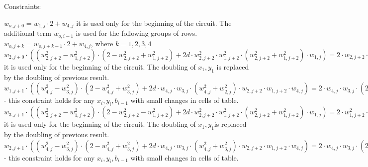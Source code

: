  Constraints:
\begin{center}
$w_{o, j + 0} = w_{1, j} \cdot 2 + w_{4, j}$ it is used only for the beginning of the circuit. The additional term $w_{o, i - 1}$ is used for the following groups of rows. \\
$w_{o, j + k} = w_{o, j + k - 1} \cdot 2 + w_{4, j}$, where $k = 1, 2, 3, 4$\\

$w_{2, j + 0} \cdot ((w_{2, j + 2}^2 - w_{1, j + 2}^2) \cdot (2 - w_{2, j + 2}^2 + w_{1, j + 2}^2) + 2d \cdot w_{2, j + 2}^2 \cdot w_{1, j + 2}^2 \cdot (w_{2, j + 2}^2 + w_{1, j + 2}^2) \cdot w_{1, j}) = 
2 \cdot w_{2, j + 2} \cdot (w_{2, j + 2} \cdot w_{1,j} + 1 - w_{1,j}) \cdot w_{1, j + 2} \cdot (2 - w_{2, j + 2}^2 + w_{1, j + 2}^2) 
+ w_{1, j + 2} \cdot (w_{2, j + 2}^2 + w_{1, j + 2}^2) \cdot (w_{2, j + 2}^2 - w_{1, j + 2}^2)\cdot w_{1, j}$ it is used only for the beginning of the circuit. The doubling of $x_1, y_1$ is replaced by the doubling of previous result.\\

$w_{1, j + 1} \cdot ((w_{4, j }^2 - w_{3, j }^2) \cdot (2 - w_{4, j}^2 + w_{3, j}^2) + 2d \cdot w_{4, j } \cdot w_{3, j } \cdot (w_{4, j}^2 + w_{2, j}^2) \cdot w_{2, j + 2} \cdot w_{1, j + 2} \cdot w_{4, j}) = 
2 \cdot w_{4, j } \cdot w_{3, j } \cdot (2 - w_{4, j }^2 + w_{3, j }^2) \cdot (w_{2, j + 2} \cdot w_{4,j} + 1 - w_{4,j})  
+ w_{3, j } \cdot (w_{4, j }^2 + w_{3, j }^2) \cdot (w_{4, j }^2 - w_{3, j }^2) \cdot w_{1, j + 2} \cdot w_{4, j}$ - this constraint holds for any $x_i, y_i, b_{i -1}$ with small changes in cells of table. \\

$w_{3, j+1} \cdot ((w_{2, j + 2}^2 - w_{1, j + 2}^2) \cdot (2 - w_{2, j + 2}^2 - w_{1, j + 2}^2) + 2d \cdot w_{2, j + 2}^2 \cdot w_{1, j + 2}^2 \cdot (w_{2, j + 2}^2 + w_{1, j + 2}^2) \cdot w_{1, j}) = 
2 \cdot w_{1, j + 2}^2 \cdot (w_{2, j + 2} \cdot (2 - w_{2, j + 2}^2 + w_{1, j + 2}^2)\cdot w_{1, j}  
+ (w_{2, j + 2}^2 - w_{1, j + 2}^2)\cdot (w_{2, j + 2}^2 + w_{1, j + 2}^2) \cdot (w_{2, j + 2} \cdot w_{1,j} + 1 - w_{1,j}) $ it is used only for the beginning of the circuit. The doubling of $x_1, y_1$is replaced by the doubling of previous result.\\

$w_{2, j + 1} \cdot ((w_{4, j }^2 - w_{3, j }^2) \cdot (2 - w_{4, j}^2 + w_{3, j}^2) + 2d \cdot w_{4, j } \cdot w_{3, j } \cdot (w_{4, j}^2 + w_{3, j}^2) \cdot w_{2, j + 2} \cdot w_{1, j + 2} \cdot w_{4, j}) = 
2 \cdot w_{4, j } \cdot w_{3, j } \cdot (2 - w_{4, j }^2 + w_{3, j }^2) \cdot w_{1, j + 2} \cdot w_{4,j}  
+  (w_{2, j + 2} \cdot w_{4,j} + 1 - w_{4,j}) \cdot (w_{4, j }^2 + w_{3, j }^2) \cdot (w_{4, j }^2 - w_{3, j }^2) $ - this constraint holds for any $x_i, y_i, b_{i -1}$ with small changes in cells of table. \\

\end{center}